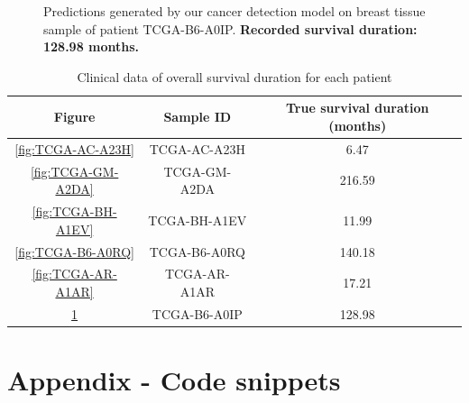 \documentclass{l4proj}
\begin{document}
\begin{appendices}
\begin{figure}[hbt!]
    \caption{Predictions generated by our cancer detection model on breast tissue sample of patient TCGA-B6-A0IP. \textbf{Recorded survival duration: 128.98 months.}}
    \label{fig:TCGA-B6-A0IP}
\end{figure}




\begin{table}[ht]
    \centering
    \begin{tabular}{|c|c|c|}
    \hline
        Figure & Sample ID & True survival duration (months)  \\ \hline
        \ref{fig:TCGA-AC-A23H} & TCGA-AC-A23H & 6.47 \\ \hline
        \ref{fig:TCGA-GM-A2DA} & TCGA-GM-A2DA & 216.59 \\ \hline
        \ref{fig:TCGA-BH-A1EV} & TCGA-BH-A1EV & 11.99 \\ \hline
        \ref{fig:TCGA-B6-A0RQ} & TCGA-B6-A0RQ & 140.18 \\ \hline
        \ref{fig:TCGA-AR-A1AR} & TCGA-AR-A1AR & 17.21 \\ \hline
        \ref{fig:TCGA-B6-A0IP} & TCGA-B6-A0IP & 128.98 \\ \hline
    
    \end{tabular}
    \caption{Clinical data of overall survival duration for each patient}
    \label{tab:TCGA-BH-A1EV-data}
\end{table}


\chapter{Appendix - Code snippets}


\end{appendices}
\end{document}
